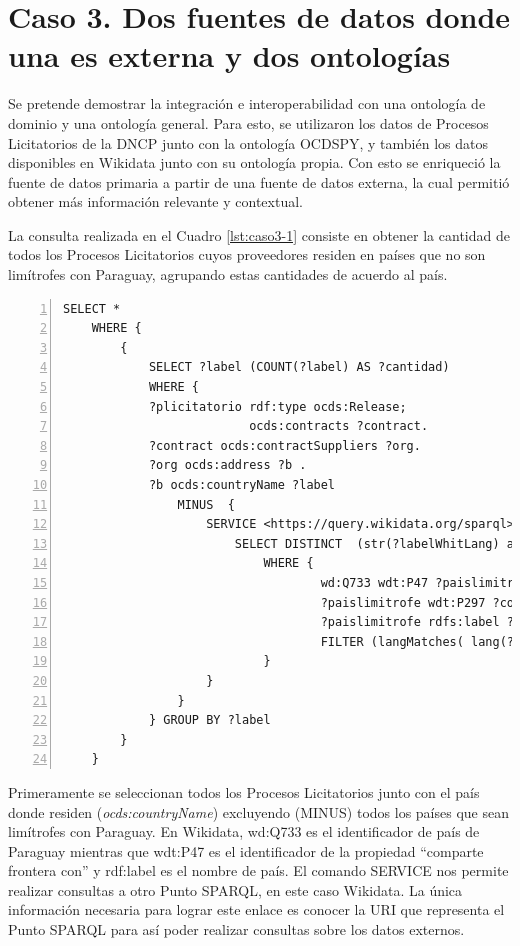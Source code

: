 \section{Caso 3. Dos fuentes de datos donde una es externa y dos ontologías}
\label{section:caso3}
Se pretende demostrar la integración e interoperabilidad con una ontología de dominio y una ontología general. Para esto, se utilizaron los datos de Procesos Licitatorios de la DNCP junto con la ontología OCDSPY, y también los datos disponibles en Wikidata  junto con su ontología propia. Con esto se enriqueció la fuente de datos primaria a partir de una fuente de datos externa, la cual permitió obtener más información relevante y contextual.

La consulta realizada en el Cuadro  \ref{lst:caso3-1} consiste en obtener la cantidad de todos los Procesos Licitatorios cuyos proveedores residen en países que no son limítrofes con Paraguay, agrupando estas cantidades de acuerdo al país.

\noindent\begin{minipage}[c]{\textwidth}
\begin{lstlisting}[captionpos=b, caption=Integración con una fuente de datos externa utilizando dos ontologías, label=lst:caso3-1,  numbers=left, numberstyle=\tiny\color{mygray},frame=single]
SELECT *
    WHERE {
        {
            SELECT ?label (COUNT(?label) AS ?cantidad)
            WHERE {
            ?plicitatorio rdf:type ocds:Release;
                          ocds:contracts ?contract.
            ?contract ocds:contractSuppliers ?org.
            ?org ocds:address ?b .
            ?b ocds:countryName ?label
                MINUS  { 
                    SERVICE <https://query.wikidata.org/sparql>{ 
                        SELECT DISTINCT  (str(?labelWhitLang) as ?label)
                            WHERE { 
                                    wd:Q733 wdt:P47 ?paislimitrofe .
                                    ?paislimitrofe wdt:P297 ?codigoPais.
                                    ?paislimitrofe rdfs:label ?labelWhitLang.
                                    FILTER (langMatches( lang(?labelWhitLang), "ES") )
                            }        
                    }
                }
            } GROUP BY ?label
        }
    }
 \end{lstlisting}
\end{minipage}

Primeramente se seleccionan todos los Procesos Licitatorios junto con el país donde residen (\textit{ocds:countryName}) excluyendo (MINUS) todos los países que sean limítrofes con Paraguay. En Wikidata, wd:Q733 es el identificador de país de Paraguay mientras que wdt:P47 es el identificador de la propiedad “comparte frontera con” y rdf:label es el nombre de país. El comando SERVICE nos permite realizar consultas a otro Punto SPARQL, en este caso Wikidata. La única información necesaria para lograr este enlace es conocer la URI que representa el Punto SPARQL para así poder realizar consultas sobre los datos externos.


